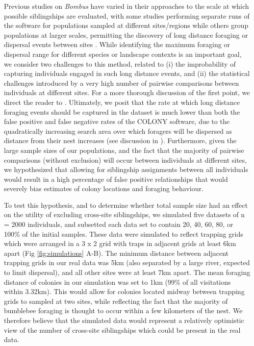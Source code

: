 \documentclass[12pt]{article}
\begin{document}
Previous studies on \emph{Bombus} have varied in their approaches to the scale at which possible siblingships are evaluated, with some studies performing separate runs of the software for populations sampled at different sites/regions \parencite{jhaResourceDiversityLandscapelevel2013} while others group populations at larger scales, permitting the discovery of long distance foraging or dispersal events between sites \parencite{lepaisEstimationBumblebeeQueen2010, molaWildfireRevealsTransient2020, raoBumbleBeeHymenoptera2012}. While identifying the maximum foraging or dispersal range for different species or landscape contexts is an important goal, we consider two challenges to this method, related to (i) the improbability of capturing individuals engaged in such long distance events, and (ii) the statistical challenges introduced by a very high number of pairwise comparisons between individuals at different sites. For a more thorough discussion of the first point, we direct the reader to \textcite{lepaisEstimationBumblebeeQueen2010a}. Ultimately, we posit that the rate at which long distance foraging events should be captured in the dataset is much lower than both the false positive and false negative rates of the COLONY software, due to the quadratically increasing search area over which foragers will be dispersed as distance from their nest increases (see discussion in \textcite{osborneBumblebeeFlightDistances2008}). Furthermore, given the large sample sizes of our populations, and the fact that the majority of pairwise comparisons (without exclusion) will occur between individuals at different sites, we hypothesized that allowing for siblingship assignments between all individuals would result in a high percentage of false positive relationships that would severely bias estimates of colony locations and foraging behaviour.

To test this hypothesis, and to determine whether total sample size had an effect on the utility of excluding cross-site siblingships, we simulated five datasets of n = 2000 individuals, and subsetted each data set to contain 20, 40, 60, 80, or 100\% of the initial samples. These data were simulated to reflect trapping grids which were arranged in a 3 x 2 grid with traps in adjacent grids at least 6km apart (Fig \ref{fig:simulations} A-B). The minimum distance between adjacent trapping grids in our real data was 5km (also separated by a large river, expected to limit dispersal), and all other sites were at least 7km apart. The mean foraging distance of colonies in our simulation was set to 1km (99\% of all visitations within 3.32km). This would allow for colonies located midway between trapping grids to sampled at two sites, while reflecting the fact that the majority of bumblebee foraging is thought to occur within a few kilometers of the nest. We therefore believe that the simulated data would represent a relatively optimistic view of the number of cross-site siblingships which could be present in the real data.
\end{document}
